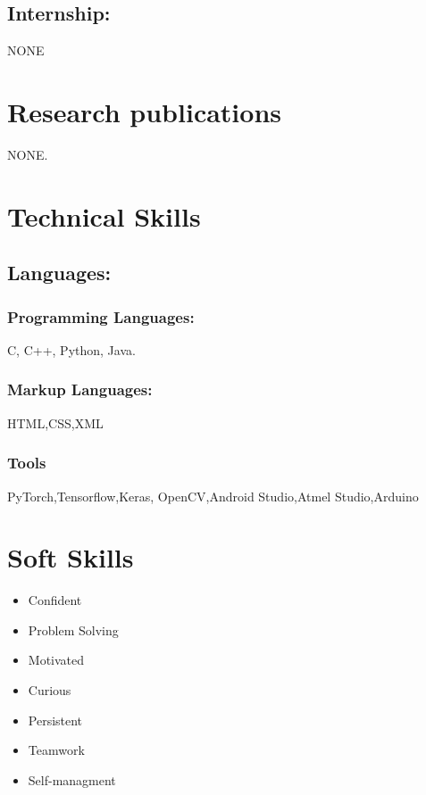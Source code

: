 \documentclass[10pt]{article}
\begin{document}
\subsection{Internship:}
NONE

\section{Research publications}
	NONE.
\section{Technical Skills}
	\subsection{Languages:}
		\subsubsection{Programming Languages: }
			C, C++, Python, Java.
		\subsubsection{Markup Languages:}
			HTML,CSS,XML
		\subsubsection{Tools}
			PyTorch,Tensorflow,Keras, OpenCV,Android Studio,Atmel Studio,Arduino

\section{Soft Skills}
	\begin{multicols}{2}
	\begin{itemize}
	\item Confident \\
 	\item Problem Solving\\
	\item Motivated\\ 
	\item Curious\\
	\columnbreak
	\item Persistent \\
	\item Teamwork\\
	\item Self-managment\\
	\end{itemize}
	\end{multicols}
\end{document}
